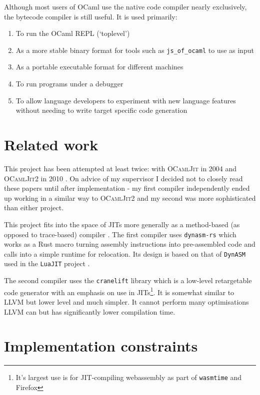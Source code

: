 Although most users of OCaml use the native code compiler nearly exclusively, the bytecode
compiler is still useful. It is used primarily:

\begin{enumerate}
    \item To run the OCaml REPL (`toplevel')
    \item As a more stable binary format for tools such as \texttt{js\_of\_ocaml} to use as input
    \item As a portable executable format for different machines
    \item To run programs under a debugger
    \item To allow language developers to experiment with new language features without needing
          to write target specific code generation
\end{enumerate}

\section{Related work}

This project has been attempted at least twice: with \textsc{OCamlJit} in 2004 \cite{ocjit1} and
\textsc{OCamlJit2} in 2010 \cite{ocjit2}. On advice of my supervisor I decided not to closely
read these papers until after implementation - my first compiler independently ended up working
in a similar way to \textsc{OCamlJit2} and my second was more sophisticated than either project.

This project fits into the space of JITs more generally as a method-based (as opposed to
trace-based) compiler \cite{pyket}. The first compiler uses \texttt{dynasm-rs} \cite{dynasmrs}
which works as a Rust macro turning assembly instructions into pre-assembled code and calls into
a simple runtime for relocation. Its design is based on that of \texttt{DynASM} used in the
\texttt{LuaJIT} project \cite{dynasm}.

The second compiler uses the \texttt{cranelift} \cite{cranelift} library which is a low-level
retargetable
code generator with an emphasis on use in JITs\footnote{It's largest use is for JIT-compiling
    webassembly as part of \texttt{wasmtime} and Firefox}. It is somewhat similar to LLVM but lower
level and much simpler. It cannot perform many optimisations LLVM can but has significantly lower
compilation time.

\section{Implementation constraints}


